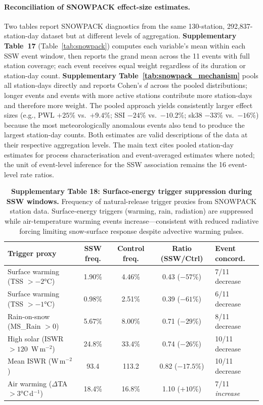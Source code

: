 \documentclass[11pt,letterpaper]{article}
\begin{document}
\paragraph*{Reconciliation of SNOWPACK effect-size estimates.}
Two tables report SNOWPACK diagnostics from the same 130-station, 292,837-station-day dataset but at different levels of aggregation. \textbf{Supplementary Table~17} (Table~\ref{tab:snowpack}) computes each variable's mean within each SSW event window, then reports the grand mean across the 11 events with full station coverage; each event receives equal weight regardless of its duration or station-day count. \textbf{Supplementary Table~\ref{tab:snowpack_mechanism}} pools all station-days directly and reports Cohen's $d$ across the pooled distributions; longer events and events with more active stations contribute more station-days and therefore more weight. The pooled approach yields consistently larger effect sizes (e.g., PWL $+25\%$ vs.\ $+9.4\%$; SSI $-24\%$ vs.\ $-10.2\%$; sk38 $-33\%$ vs.\ $-16\%$) because the most meteorologically anomalous events also tend to produce the largest station-day counts. Both estimates are valid descriptions of the data at their respective aggregation levels. The main text cites pooled station-day estimates for process characterisation and event-averaged estimates where noted; the unit of event-level inference for the SSW association remains the 16 event-level rate ratios.

\begin{table}[!ht]
\centering
\caption{\textbf{Supplementary Table 18: Surface-energy trigger suppression during SSW windows.}
Frequency of natural-release trigger proxies from SNOWPACK station data. Surface-energy triggers (warming, rain, radiation) are suppressed while air-temperature warming events increase---consistent with reduced radiative forcing limiting snow-surface response despite advective warming pulses.}
\label{tab:triggers}
\small
\begin{tabular}{lcccl}
\toprule
Trigger proxy & SSW freq. & Control freq. & Ratio (SSW/Ctrl) & Event concord. \\
\midrule
Surface warming (TSS $> -2$°C) & 1.90\% & 4.46\% & 0.43 ($-57\%$) & 7/11 decrease \\
Surface warming (TSS $> -1$°C) & 0.98\% & 2.51\% & 0.39 ($-61\%$) & 6/11 decrease \\
Rain-on-snow (MS\_Rain $> 0$) & 5.67\% & 8.00\% & 0.71 ($-29\%$) & 8/11 decrease \\
High solar (ISWR $> 120$~W\,m$^{-2}$) & 24.8\% & 33.4\% & 0.74 ($-26\%$) & 10/11 decrease \\
Mean ISWR (W\,m$^{-2}$) & 93.4 & 113.2 & 0.82 ($-17.5\%$) & 10/11 decrease \\
\midrule
Air warming ($\Delta$TA $> 3$°C\,d$^{-1}$) & 18.4\% & 16.8\% & 1.10 ($+10\%$) & 7/11 \emph{increase} \\
\bottomrule
\end{tabular}
\end{table}
\end{document}
